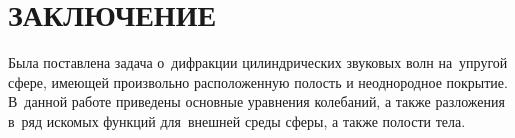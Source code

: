 \newpage
\section*{ЗАКЛЮЧЕНИЕ}
Была поставлена задача о~дифракции цилиндрических звуковых волн на~упругой сфере, имеющей произвольно расположенную полость и неоднородное покрытие. В~данной работе приведены основные уравнения колебаний, а также разложения в~ряд искомых функций для~внешней среды сферы, а также полости тела.


